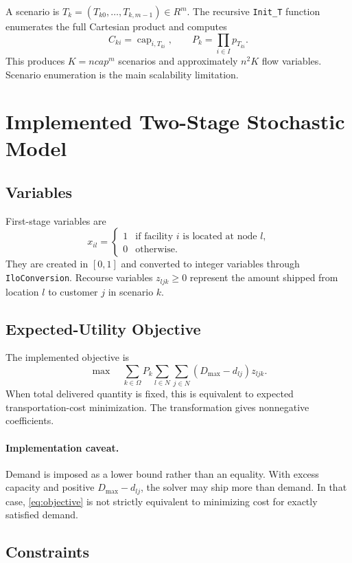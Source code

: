 \documentclass[11pt,a4paper]{article}
\newcommand{\code}[1]{\texttt{#1}}
\begin{document}
A scenario is $T_k=(T_{k0},\ldots,T_{k,m-1})\in R^m$. The recursive
\code{Init\_T} function enumerates the full Cartesian product and computes
\[
C_{ki}=\operatorname{cap}_{i,T_{ki}},
\qquad
P_k=\prod_{i\in I}p_{T_{ki}}.
\]
This produces $K=ncap^m$ scenarios and approximately $n^2K$ flow variables.
Scenario enumeration is the main scalability limitation.

\section{Implemented Two-Stage Stochastic Model}

\subsection{Variables}

First-stage variables are
\[
x_{il}=\begin{cases}
1&\text{if facility $i$ is located at node $l$,}\\
0&\text{otherwise.}
\end{cases}
\]
They are created in $[0,1]$ and converted to integer variables through
\code{IloConversion}. Recourse variables
$z_{ljk}\geq0$ represent the amount shipped from location $l$ to customer
$j$ in scenario $k$.

\subsection{Expected-Utility Objective}

The implemented objective is
\begin{equation}
\max\quad
\sum_{k\in\Omega}P_k\sum_{l\in N}\sum_{j\in N}
(D_{\max}-d_{lj})z_{ljk}.
\label{eq:objective}
\end{equation}
When total delivered quantity is fixed, this is equivalent to expected
transportation-cost minimization. The transformation gives nonnegative
coefficients.

\paragraph{Implementation caveat.}
Demand is imposed as a lower bound rather than an equality. With excess
capacity and positive $D_{\max}-d_{lj}$, the solver may ship more than demand.
In that case, \eqref{eq:objective} is not strictly equivalent to minimizing
cost for exactly satisfied demand.

\subsection{Constraints}
\end{document}
